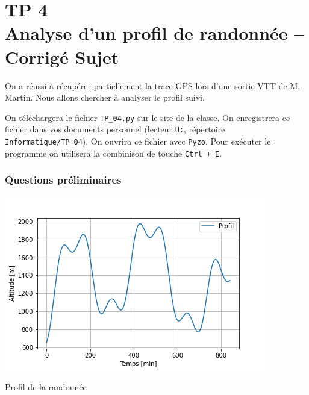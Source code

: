 \chapter*{TP 4 \\
Analyse d'un profil de randonnée -- \ifprof Corrigé \else Sujet \fi}


\iflivret {} \else
\ifprof  {} \else \fi
\fi
\setcounter{question}{0}

\ifprof
\else

On a réussi à récupérer partiellement la trace GPS lors d'une sortie VTT de M. Martin. Nous allons chercher à analyser le profil suivi.

On téléchargera le fichier \texttt{TP\_04.py} sur le site de la classe. On enregistrera ce fichier dans vos documents personnel (lecteur \texttt{U:}, répertoire \texttt{Informatique/TP\_04}). On ouvrira ce fichier avec \texttt{Pyzo}.
Pour exécuter le programme on utilisera la combinison de touche \texttt{Ctrl + E}.
\fi




\subsection*{Questions préliminaires}

\begin{marginfigure}
\centering
\includegraphics[width=\linewidth]{fig_01}
\caption{Profil de la randonnée}
\end{marginfigure}


